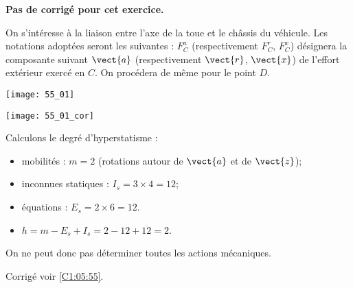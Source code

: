 \normalfalse \difficiletrue \tdifficilefalse
\correctiontrue


\setcounter{numques}{0}
\ifcorrection
\else
\textbf{Pas de corrigé pour cet exercice.}
\fi

\ifprof
\else
On s'intéresse à la liaison entre l'axe de la toue et le châssis du véhicule. Les notations adoptées seront les suivantes : $F^a_{C}$ (respectivement $F^r_{C}$, $F^x_{C}$) désignera la composante suivant $\vect{a}$ (respectivement $\vect{r}$, $\vect{x}$) de l'effort extérieur exercé en $C$. On procédera de même pour le point $D$. 
\begin{center}
\texttt{[image: 55\_01]}
\end{center}


\fi

\ifprof
\begin{center}
\texttt{[image: 55\_01\_cor]}
\end{center}

\else
\fi



\ifprof
Calculons le degré d'hyperstatisme : 
\begin{itemize}
\item mobilités : $m=2$ (rotations autour de $\vect{a}$ et de $\vect{z}$);
\item inconnues statiques : $I_s = 3 \times 4 = 12$;
\item équations : $E_s = 2\times 6=12$. 
\item $h = m-E_s + I_s= 2 -12 + 12 = 2$.
\end{itemize}
On ne peut donc pas déterminer toutes les actions mécaniques. 

\else
\fi
\ifprof
\else
\begin{flushright}
\footnotesize{Corrigé  voir \ref{C1:05:55}.}
\end{flushright}%
\fi
